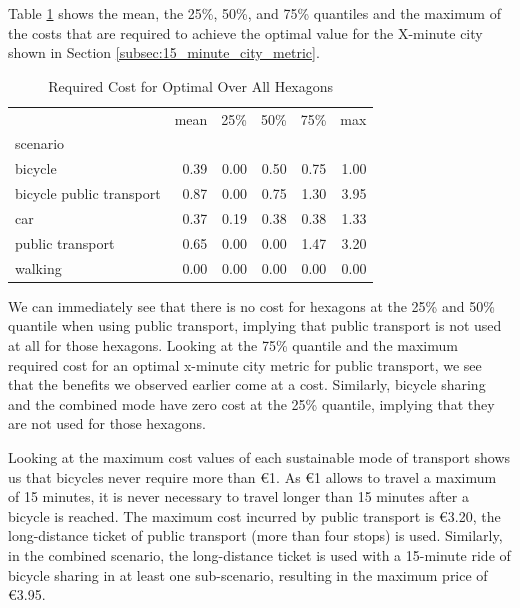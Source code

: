 Table \ref{tab:required_cost} shows the mean, the 25\%, 50\%, and 75\% quantiles and the maximum of the costs that are required to achieve the optimal value for the X-minute city shown in Section \ref{subsec:15_minute_city_metric}.
\begin{table}
  \caption{Required Cost for Optimal Over All Hexagons}
  \label{tab:required_cost}
  \begin{center}
    \begin{tabular}{lrrrrr}
     & mean & 25\% & 50\% & 75\% & max \\
    scenario &  &  &  &  &  \\
    bicycle & 0.39 & 0.00 & 0.50 & 0.75 & 1.00 \\
    bicycle public transport & 0.87 & 0.00 & 0.75 & 1.30 & 3.95 \\
    car & 0.37 & 0.19 & 0.38 & 0.38 & 1.33 \\
    public transport & 0.65 & 0.00 & 0.00 & 1.47 & 3.20 \\
    walking & 0.00 & 0.00 & 0.00 & 0.00 & 0.00 \\
    \end{tabular}
  \end{center}
\end{table}
We can immediately see that there is no cost for hexagons at the 25\% and 50\% quantile when using public transport, implying that public transport is not used at all for those hexagons.
Looking at the 75\% quantile and the maximum required cost for an optimal x-minute city metric for public transport, we see that the benefits we observed earlier come at a cost.
Similarly, bicycle sharing and the combined mode have zero cost at the 25\% quantile, implying that they are not used for those hexagons.

Looking at the maximum cost values of each sustainable mode of transport shows us that bicycles never require more than \euro{1}.
As \euro{1} allows to travel a maximum of 15 minutes, it is never necessary to travel longer than 15 minutes after a bicycle is reached.
The maximum cost incurred by public transport is \euro{3.20}, the long-distance ticket of public transport (more than four stops) is used.
Similarly, in the combined scenario, the long-distance ticket is used with a 15-minute ride of bicycle sharing in at least one sub-scenario, resulting in the maximum price of \euro{3.95}.

